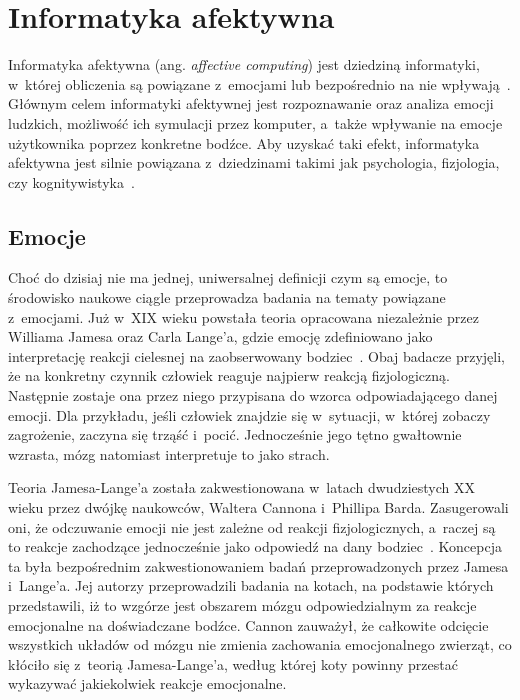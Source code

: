 \chapter{Informatyka afektywna}
\label{cha:affectiveComputing}

Informatyka afektywna (ang. \textit{affective computing}) jest dziedziną informatyki, w~której obliczenia są powiązane z~emocjami lub bezpośrednio na nie wpływają~\cite{Picard:1997:AC:265013}. Głównym celem informatyki afektywnej jest rozpoznawanie oraz analiza emocji ludzkich, możliwość ich symulacji przez komputer, a~także wpływanie na emocje użytkownika poprzez konkretne bodźce. Aby uzyskać taki efekt, informatyka afektywna jest silnie powiązana z~dziedzinami takimi jak psychologia, fizjologia, czy kognitywistyka~\cite{affective_computing_review_tao_tieniu}.

\section{Emocje}
Choć do dzisiaj nie ma jednej, uniwersalnej definicji czym są emocje, to środowisko naukowe ciągle przeprowadza badania na tematy powiązane z~emocjami. Już w~XIX wieku powstała teoria opracowana niezależnie przez Williama Jamesa oraz Carla Lange'a, gdzie emocję zdefiniowano jako interpretację reakcji cielesnej na zaobserwowany bodziec~\cite{Coleman2011}. Obaj badacze przyjęli, że na konkretny czynnik człowiek reaguje najpierw reakcją fizjologiczną. Następnie zostaje ona przez niego przypisana do wzorca odpowiadającego danej emocji. Dla przykładu, jeśli człowiek znajdzie się w~sytuacji, w~której zobaczy zagrożenie, zaczyna się trząść i~pocić. Jednocześnie jego tętno gwałtownie wzrasta, mózg natomiast interpretuje to jako strach.

Teoria Jamesa-Lange'a została zakwestionowana w~latach dwudziestych XX wieku przez dwójkę naukowców, Waltera Cannona i~Phillipa Barda. Zasugerowali oni, że odczuwanie emocji nie jest zależne od reakcji fizjologicznych, a~raczej są to reakcje zachodzące jednocześnie jako odpowiedź na dany bodziec~\cite{cannon_1927}. Koncepcja ta była bezpośrednim zakwestionowaniem badań przeprowadzonych przez Jamesa i~Lange'a. Jej autorzy przeprowadzili badania na kotach, na podstawie których przedstawili, iż to wzgórze jest obszarem mózgu odpowiedzialnym za reakcje emocjonalne na doświadczane bodźce. Cannon zauważył, że całkowite odcięcie wszystkich układów od mózgu nie zmienia zachowania emocjonalnego zwierząt, co kłóciło się z~teorią Jamesa-Lange'a, według której koty powinny przestać wykazywać jakiekolwiek reakcje emocjonalne.

